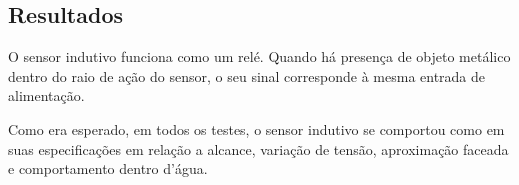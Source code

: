 

\subsection{Resultados}
O sensor indutivo funciona como um relé. Quando há presença de objeto metálico
dentro do raio de ação do sensor, o seu sinal corresponde à mesma entrada de
alimentação.

Como era esperado, em todos os testes, o sensor indutivo se comportou como em
suas especificações em relação a alcance, variação de tensão, aproximação
faceada e comportamento dentro d'água.
\label{resultados}